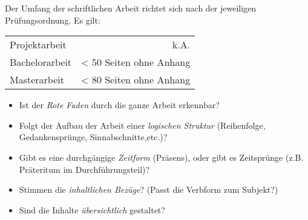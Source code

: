 Der Umfang der schriftlichen Arbeit richtet sich nach der jeweiligen Prüfungsordnung. Es gilt:
\begin{center}
\begin{tabular}{lr}
\toprule
{Projektarbeit} & k.A.\\
{Bachelorarbeit} & < 50 Seiten ohne Anhang\\
{Masterarbeit} & < 80 Seiten ohne Anhang\\
\bottomrule
\end{tabular}
\end{center}
%
\begin{itemize}
\item Ist der \emph{Rote Faden} durch die ganze Arbeit erkennbar?
\item Folgt der Aufbau der Arbeit einer \emph{logischen Struktur} (Reihenfolge, Gedankensprünge, Sinnabschnitte,etc.)?
\item Gibt es eine durchgängige \emph{Zeitform} (Präsens), oder gibt es Zeitsprünge (z.B. Präteritum im Durchführungsteil)?
\item Stimmen die \emph{inhaltlichen Bezüge}? (Passt die Verbform zum Subjekt?)
\item Sind die Inhalte \emph{übersichtlich} gestaltet?
\end{itemize}


